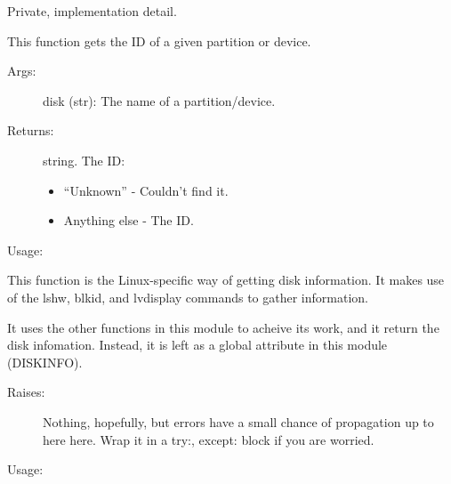 \documentclass[letterpaper,10pt,english]{sphinxmanual}
\begin{document}
\begin{fulllineitems}
\label{\detokenize{linux:getdevinfo.linux.get_id}}
Private, implementation detail.

This function gets the ID of a given partition or device.
\begin{description}
\item[{Args:}] \leavevmode
disk (str):   The name of a partition/device.

\item[{Returns:}] \leavevmode
string. The ID:
\begin{itemize}
\item {} 
“Unknown”     - Couldn’t find it.

\item {} 
Anything else - The ID.

\end{itemize}

\end{description}

Usage:

\begin{sphinxVerbatim}[commandchars=\\\{\}]
  
\end{sphinxVerbatim}

\end{fulllineitems}


\begin{fulllineitems}
\label{\detokenize{linux:getdevinfo.linux.get_info}}
This function is the Linux-specific way of getting disk information.
It makes use of the lshw, blkid, and lvdisplay commands to gather
information.

It uses the other functions in this module to acheive its work, and
it  return the disk infomation. Instead, it is left as a
global attribute in this module (DISKINFO).
\begin{description}
\item[{Raises:}] \leavevmode
Nothing, hopefully, but errors have a small chance of propagation
up to here here. Wrap it in a try:, except: block if you are worried.

\end{description}

Usage:

\begin{sphinxVerbatim}[commandchars=\\\{\}]
\end{sphinxVerbatim}

\end{fulllineitems}
\end{document}
